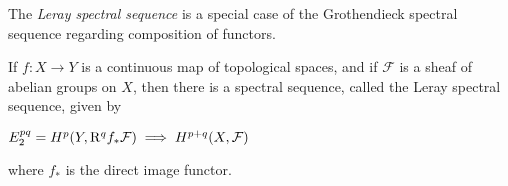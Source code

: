 \documentclass{article}
\begin{document}
The \emph{Leray spectral sequence} is a special case of the Grothendieck spectral sequence regarding composition of functors.

If $f : X\to Y$ is a continuous map of topological spaces, and if $\mathcal{F}$ is a sheaf of abelian groups on $X$, then there is a spectral sequence, called the Leray spectral sequence, given by

$E_2^{pq} = H^p(Y,{\rm R}^q f_* \mathcal{F})\implies H^{p+q}(X,\mathcal{F})$

where $f_*$ is the direct image functor.
\end{document}
